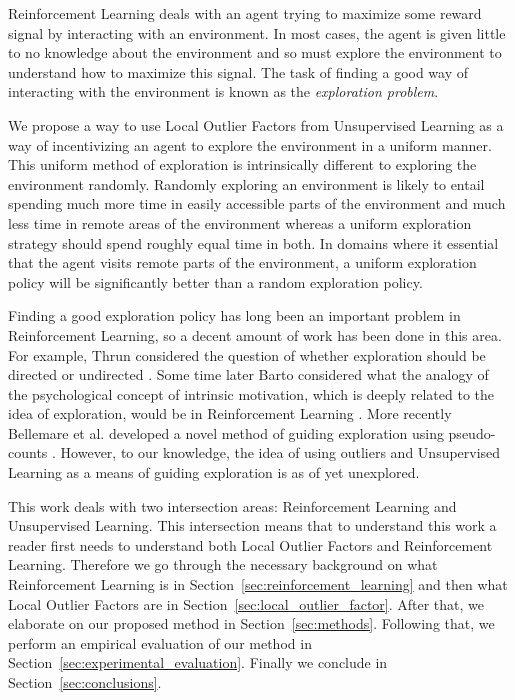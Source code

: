 \documentclass[../main.tex]{subfiles}
\begin{document}
Reinforcement Learning deals with an agent trying to maximize some reward signal by interacting with an environment. In most cases, the agent is given little to no knowledge about the environment and so must explore the environment to understand how to maximize this signal. The task of finding a good way of interacting with the environment is known as the \textit{exploration problem}.

We propose a way to use Local Outlier Factors from Unsupervised Learning as a way of incentivizing an agent to explore the environment in a uniform manner. This uniform method of exploration is intrinsically different to exploring the environment randomly. Randomly exploring an environment is likely to entail spending much more time in easily accessible parts of the environment and much less time in remote areas of the environment whereas a uniform exploration strategy should spend roughly equal time in both. In domains where it essential that the agent visits remote parts of the environment, a uniform exploration policy will be significantly better than a random exploration policy.

Finding a good exploration policy has long been an important problem in Reinforcement Learning, so a decent amount of work has been done in this area. For example, Thrun considered the question of whether exploration should be directed or undirected \cite{Thrun:1992:EER:865072}. Some time later Barto considered what the analogy of the psychological concept of intrinsic motivation, which is deeply related to the idea of exploration, would be in Reinforcement Learning \cite{Barto2013}. More recently Bellemare et al. developed a novel method of guiding exploration using pseudo-counts \cite{DBLP:conf/nips/BellemareSOSSM16}. However, to our knowledge, the idea of using outliers and Unsupervised Learning as a means of guiding exploration is as of yet unexplored.

This work deals with two intersection areas: Reinforcement Learning and Unsupervised Learning. This intersection means that to understand this work a reader first needs to understand both Local Outlier Factors and Reinforcement Learning. Therefore we go through the necessary background on what Reinforcement Learning is in Section~\ref{sec:reinforcement_learning} and then what Local Outlier Factors are in Section~\ref{sec:local_outlier_factor}. After that, we elaborate on our proposed method in Section~\ref{sec:methods}. Following that, we perform an empirical evaluation of our method in Section~\ref{sec:experimental_evaluation}. Finally we conclude in Section~\ref{sec:conclusions}.
\end{document}
